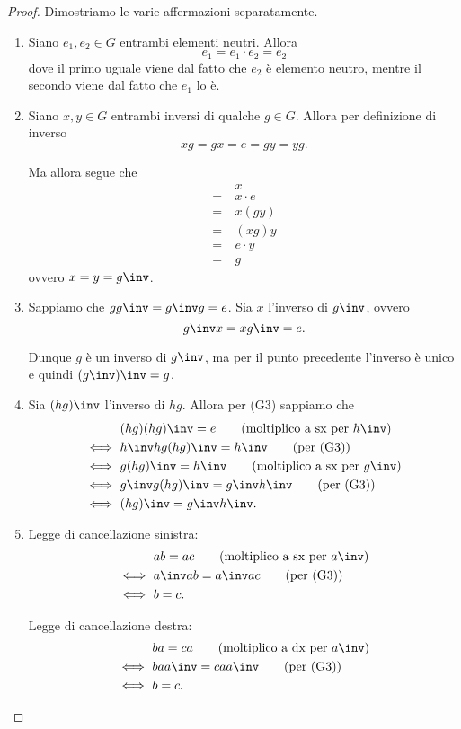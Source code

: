 \begin{proof}
    Dimostriamo le varie affermazioni separatamente.
    \begin{enumerate}[label={(\roman*)}]
        \item Siano $e_1, e_2 \in G$ entrambi elementi neutri. Allora \[
            e_1 = e_1 \cdot e_2 = e_2    
        \] dove il primo uguale viene dal fatto che $e_2$ è elemento neutro, mentre il secondo viene dal fatto che $e_1$ lo è.
        \item Siano $x, y \in G$ entrambi inversi di qualche $g \in G$. Allora per definizione di inverso \[
            xg = gx = e = gy = yg.    
        \]

        Ma allora segue che \begin{align*}
            &x \tag*{(el. neutro)}\\
            =\ &x \cdot e \tag*{($e = gy$)}\\
            =\ &x(gy) \tag*{(per (G1))}\\
            =\ &(xg)y \tag*{($xg = e$)}\\
            =\ &e \cdot y \tag*{(el. neutro)}\\
            =\ &g
        \end{align*} ovvero $x = y = g\inv$.
        \item Sappiamo che $gg\inv = g\inv g = e$. Sia $x$ l'inverso di $g\inv$, ovvero \[
            g\inv x = xg\inv = e.    
        \]
        
        Dunque $g$ è un inverso di $g\inv$, ma per il punto precedente l'inverso è unico e quindi $(g\inv)\inv = g$.
        \item Sia $(hg)\inv$ l'inverso di $hg$. Allora per (G3) sappiamo che \begin{align*}
            &(hg)(hg)\inv = e \tag*{(moltiplico a sx per $h\inv$)} \\
            \iff\ &h\inv hg(hg)\inv = h\inv \tag*{(per (G3))}\\
            \iff\ &g(hg)\inv = h\inv \tag*{(moltiplico a sx per $g\inv$)} \\
            \iff\ &g\inv g(hg)\inv = g\inv h\inv \tag*{(per (G3))}\\
            \iff\ &(hg)\inv = g\inv h\inv.
        \end{align*}
        \item Legge di cancellazione sinistra: \begin{align*}
            &ab = ac \tag*{(moltiplico a sx per $a\inv$)} \\
            \iff\ &a\inv ab = a\inv ac \tag*{(per (G3))} \\
            \iff\ &b = c.
        \end{align*}

        Legge di cancellazione destra: \begin{align*}
            &ba = ca \tag*{(moltiplico a dx per $a\inv$)} \\
            \iff\ & ba a\inv = ca a\inv \tag*{(per (G3))} \\
            \iff\ &b = c. \tag*{\qedhere}
        \end{align*}
    \end{enumerate}
\end{proof}
